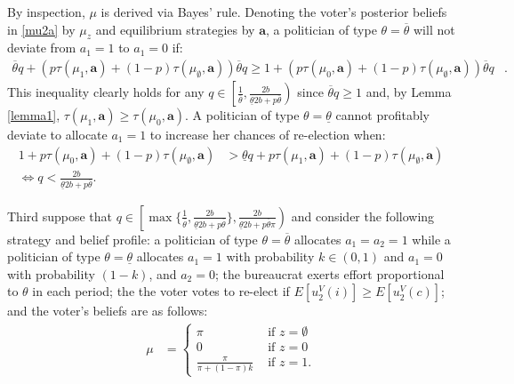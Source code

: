 \documentclass[11pt,english]{article}
\begin{document}
By inspection, $\mu$ is derived via Bayes' rule. Denoting the voter's posterior beliefs in \eqref{mu2a} by $\mu_z$ and equilibrium strategies by $\boldsymbol{a}$, a politician of type $\theta = \overline{\theta}$ will not deviate from $a_1 = 1$ to $a_1 = 0$ if: 
\begin{align*}
\overline{\theta}q + \left(p\tau(\mu_1, \boldsymbol{a}) + (1-p) \tau(\mu_\emptyset, \boldsymbol{a})\right)\overline{\theta}q \geq 1 + \left(p\tau(\mu_0, \boldsymbol{a}) + (1-p) \tau(\mu_\emptyset, \boldsymbol{a})\right) \overline{\theta}q&.
\end{align*}
\noindent This inequality clearly holds for any $q \in \left[\frac{1}{\overline{\theta}}, \frac{2b}{\underline{\theta}2b + p\overline{\theta}}\right)$ since $\overline{\theta}q \geq 1$ and, by Lemma \ref{lemma1}, $\tau(\mu_1, \boldsymbol{a}) \geq \tau(\mu_0, \boldsymbol{a})$. A politician of type $\theta = \underline{\theta}$ cannot profitably deviate to allocate $a_1=1$ to increase her chances of re-election when:
\begin{align*}
1 + p\tau(\mu_0, \boldsymbol{a}) + (1-p) \tau(\mu_\emptyset, \boldsymbol{a})&> \underline{\theta}q + p\tau(\mu_1, \boldsymbol{a})+ (1-p)\tau(\mu_\emptyset, \boldsymbol{a}) \\
\Leftrightarrow q < \frac{2b}{\underline{\theta}2b + p\overline{\theta}}.
\end{align*}


Third suppose that $q \in \left[ \max\{\frac{1}{\overline{\theta}},\frac{2b}{\underline{\theta}2b + p\overline{\theta}}\}, \frac{2b}{\underline{\theta}2b + p\overline{\theta}\pi}\right)$ and consider the following strategy and belief profile: a politician of type $\theta = \overline{\theta}$ allocates $a_1 = a_2 = 1$ while a politician of type $\theta = \underline{\theta}$ allocates $a_1 = 1$ with probability $k \in (0,1)$ and $a_1 = 0$ with probability $(1-k)$, and $a_2 = 0$; the bureaucrat exerts effort proportional to $\theta$ in each period; the the voter votes to re-elect if $E[u_2^V(i)] \geq E[u_2^V(c)]$; and the voter's beliefs are as follows:
\begin{align}\label{eq:mu3a}
\mu &= \begin{cases}
\pi & \text{ if }z = \emptyset\\
0 & \text{ if } z = 0 \\
\frac{\pi}{\pi + (1-\pi)k} & \text{ if }z = 1.
\end{cases}
\end{align}
\end{document}
